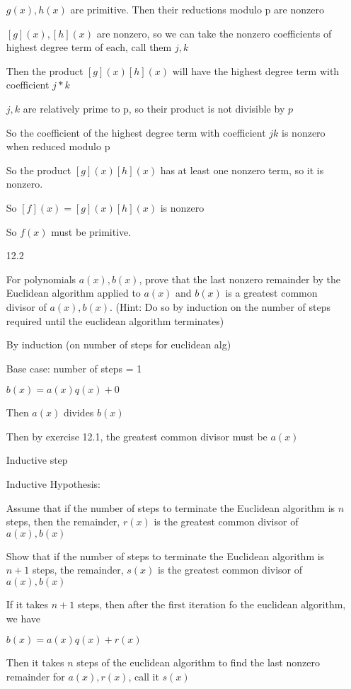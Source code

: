 \documentclass[12pt]{article}
\begin{document}
\begin{itemize}
$g(x), h(x)$ are primitive. Then their reductions modulo p are nonzero

$[g](x), [h](x)$ are nonzero, so we can take the nonzero coefficients of highest degree term of each, call them $j, k$

Then the product $[g](x)[h](x)$ will have the highest degree term with coefficient $j*k$

$j,k$ are relatively prime to p, so their product is not divisible by $p$

So the coefficient of the highest degree term with coefficient $jk$ is nonzero when reduced modulo p

So the product $[g](x)[h](x)$ has at least one nonzero term, so it is nonzero.

So $[f](x) = [g](x)[h](x)$ is nonzero

So $f(x)$ must be primitive.

\newpage
\item[12.2]

For polynomials $a(x), b(x)$, prove that the last nonzero remainder by the Euclidean algorithm applied to $a(x)$ and $b(x)$ is a greatest common divisor of $a(x),b(x)$. (Hint: Do so by induction on the number of steps required until the euclidean algorithm terminates)

By induction (on number of steps for euclidean alg)

Base case: number of steps = 1

$b(x) = a(x)q(x) + 0$

Then $a(x)$ divides $b(x)$

Then by exercise 12.1, the greatest common divisor must be $a(x)$

Inductive step

Inductive Hypothesis:

Assume that if the number of steps to terminate the Euclidean algorithm is $n$ steps, then the remainder, $r(x)$ is the greatest common divisor of $a(x),b(x)$

Show that if the number of steps to terminate the Euclidean algorithm is $n+1$ steps, the remainder, $s(x)$ is the greatest common divisor of $a(x),b(x)$

If it takes $n+1$ steps, then after the first iteration fo the euclidean algorithm, we have

$b(x) = a(x)q(x) + r(x)$

Then it takes $n$ steps of the euclidean algorithm to find the last nonzero remainder for $a(x), r(x)$, call it $s(x)$


\end{itemize}
\end{document}
